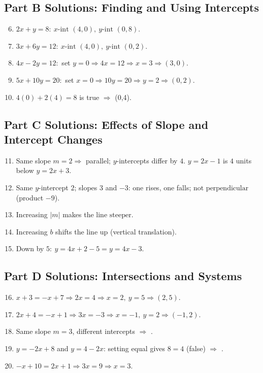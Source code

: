 \documentclass[14pt]{extarticle}
\begin{document}
\subsection*{Part B Solutions: Finding and Using Intercepts}
\begin{enumerate}
    \setcounter{enumi}{5}
    \item \(2x+y=8:\ x\text{-int }(4,0),\ y\text{-int }(0,8)\).
    \item \(3x+6y=12:\ x\text{-int }(4,0),\ y\text{-int }(0,2)\).
    \item \(4x-2y=12:\) set \(y=0\Rightarrow 4x=12\Rightarrow x=3\Rightarrow \boxed{(3,0)}\).
    \item \(5x+10y=20:\) set \(x=0\Rightarrow 10y=20\Rightarrow y=2\Rightarrow \boxed{(0,2)}\).
    \item \(4(0)+2(4)=8\) is true \(\Rightarrow\) (0,4).
\end{enumerate}

\subsection*{Part C Solutions: Effects of Slope and Intercept Changes}
\begin{enumerate}
    \setcounter{enumi}{10}
    \item Same slope \(m=2\Rightarrow\) parallel; \(y\)-intercepts differ by \(4\). \(y=2x-1\) is \(\boxed{4}\) units below \(y=2x+3\).
    \item Same \(y\)-intercept \(2\); slopes \(3\) and \(-3\): one rises, one falls; \(\boxed{\text{not perpendicular}}\) (product \(-9\)).
    \item Increasing \(|m|\) makes the line \(\boxed{\text{steeper}}\).
    \item Increasing \(b\) shifts the line \(\boxed{\text{up}}\) (vertical translation).
    \item Down by \(5:\ y=4x+2-5=\boxed{y=4x-3}\).
\end{enumerate}

\subsection*{Part D Solutions: Intersections and Systems}
\begin{enumerate}
    \setcounter{enumi}{15}
    \item \(x+3=-x+7\Rightarrow 2x=4\Rightarrow x=2,\ y=5\Rightarrow \boxed{(2,5)}\).
    \item \(2x+4=-x+1\Rightarrow 3x=-3\Rightarrow x=-1,\ y=2\Rightarrow \boxed{(-1,2)}\).
    \item Same slope \(m=3\), different intercepts \(\Rightarrow\) .
    \item \(y=-2x+8\) and \(y=4-2x\): setting equal gives \(8=4\) (false) \(\Rightarrow\) .
    \item \(-x+10=2x+1\Rightarrow 3x=9\Rightarrow \boxed{x=3}\).
\end{enumerate}
\end{document}

